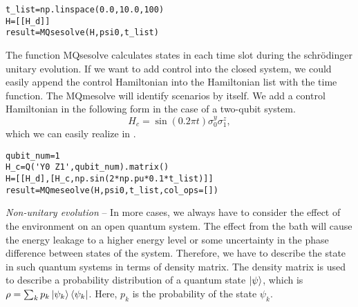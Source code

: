 \begin{lstlisting}
t_list=np.linspace(0.0,10.0,100)
H=[[H_d]]
result=MQsesolve(H,psi0,t_list)
\end{lstlisting}
The function MQsesolve calculates states in each time slot during the schr\"{o}dinger unitary evolution. If we want to add control into the closed system, we could easily append the control Hamiltonian into the Hamiltonian list with the time function. The MQmesolve will identify scenarios by itself. We add a control Hamiltonian in the following form in the case of a two-qubit system.
\begin{equation}
    H_{c}=\sin(0.2\pi t)\sigma_{0}^{y}\sigma_{1}^{z},
\end{equation}
which we can easily realize in \MindQuantum.
\begin{lstlisting}
qubit_num=1
H_c=Q('Y0 Z1',qubit_num).matrix()
H=[[H_d],[H_c,np.sin(2*np.pu*0.1*t_list)]]
result=MQmeseolve(H,psi0,t_list,col_ops=[])
\end{lstlisting}
\textit{Non-unitary evolution} -- In more cases, we always have to consider the effect of the environment on an open quantum system. The effect from the bath will cause the energy leakage to a higher energy level or some uncertainty in the phase difference between states of the system. Therefore, we have to describe the state in such quantum systems in terms of density matrix. The density matrix is used to describe a probability distribution of a quantum state $\ket{\psi}$, which is $\rho=\sum_{k}p_{k}\ket{\psi_{k}}\bra{\psi_{k}}$. Here, $p_k$ is the probability of the state $\psi_k$.

